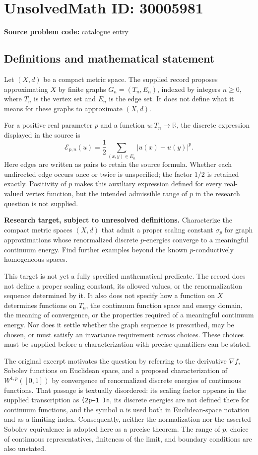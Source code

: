\documentclass[11pt]{article}
\newcommand{\R}{\mathbb{R}}
\begin{document}
\section*{UnsolvedMath ID: 30005981}
\textbf{Source problem code:} catalogue entry
\subsection{Definitions and mathematical statement}
Let \((X,d)\) be a compact metric space. The supplied record proposes approximating \(X\) by finite graphs \(G_n=(T_n,E_n)\), indexed by integers \(n\geq 0\), where \(T_n\) is the vertex set and \(E_n\) is the edge set. It does not define what it means for these graphs to approximate \((X,d)\).

For a positive real parameter \(p\) and a function \(u:T_n\to\R\), the discrete expression displayed in the source is
\[
\mathcal E_{p,n}(u)=\frac12\sum_{(x,y)\in E_n}|u(x)-u(y)|^p.
\]
Here edges are written as pairs to retain the source formula. Whether each undirected edge occurs once or twice is unspecified; the factor \(1/2\) is retained exactly. Positivity of \(p\) makes this auxiliary expression defined for every real-valued vertex function, but the intended admissible range of \(p\) in the research question is not supplied.

\textbf{Research target, subject to unresolved definitions.} Characterize the compact metric spaces \((X,d)\) that admit a proper scaling constant \(\sigma_p\) for graph approximations whose renormalized discrete \(p\)-energies converge to a meaningful continuum energy. Find further examples beyond the known \(p\)-conductively homogeneous spaces.

This target is not yet a fully specified mathematical predicate. The record does not define a proper scaling constant, its allowed values, or the renormalization sequence determined by it. It also does not specify how a function on \(X\) determines functions on \(T_n\), the continuum function space and energy domain, the meaning of convergence, or the properties required of a meaningful continuum energy. Nor does it settle whether the graph sequence is prescribed, may be chosen, or must satisfy an invariance requirement across choices. These choices must be supplied before a characterization with precise quantifiers can be stated.

The original excerpt motivates the question by referring to the derivative \(\nabla f\), Sobolev functions on Euclidean space, and a proposed characterization of \(W^{1,p}([0,1])\) by convergence of renormalized discrete energies of continuous functions. That passage is textually disordered: its scaling factor appears in the supplied transcription as \texttt{(2p−1 )n}, its discrete energies are not defined there for continuum functions, and the symbol \(n\) is used both in Euclidean-space notation and as a limiting index. Consequently, neither the normalization nor the asserted Sobolev equivalence is adopted here as a precise theorem. The range of \(p\), choice of continuous representatives, finiteness of the limit, and boundary conditions are also unstated.
\end{document}
